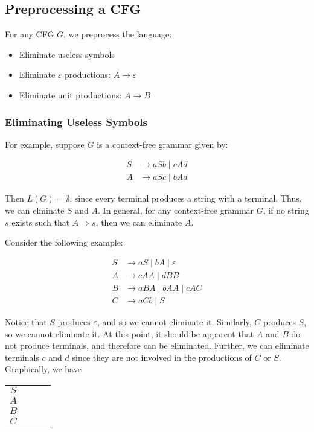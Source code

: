 \subsection{Preprocessing a CFG}\label{subsec:preprocessing-a-cfg}
For any CFG \(G\), we preprocess the language:

\begin{itemize}
    \item Eliminate useless symbols
    \item Eliminate \(\varepsilon \) productions: \(A\to\varepsilon \)
    \item Eliminate unit productions: \(A\to B\)
\end{itemize}

\subsubsection{Eliminating Useless Symbols}\label{subsubsec:eliminating-useless-symbols}
For example, suppose \(G\) is a context-free grammar given by:\@

\begin{align*}
    S &\to aSb\mid cAd\\
    A &\to aSc\mid bAd 
\end{align*}

Then \(L(G)=\emptyset \), since every terminal produces a string with a terminal. Thus, we can elminate \(S\) and \(A\). In general, for any context-free grammar \(G\), if no string \(s\) exists such that \(A\Rightarrow s\), then we can eliminate \(A\). 

Consider the following example:\@

\begin{align*}
    S &\to aS\mid bA\mid \varepsilon \\
    A &\to cAA\mid dBB\\
    B &\to aBA\mid bAA\mid cAC\\
    C &\to aCb\mid S
\end{align*}

Notice that \(S\) produces \(\varepsilon \), and so we cannot eliminate it. Similarly, \(C\) produces \(S\), so we cannot eliminate it. At this point, it should be apparent that \(A\) and \(B\) do not produce terminals, and therefore can be eliminated. Further, we can eliminate terminals \(c\) and \(d\) since they are not involved in the productions of \(C\) or \(S\). Graphically, we have

\begin{tabular}{c c c c}
    \(S\) & & & \\
    \(A\) & & & \\
    \(B\) & & & \\
    \(C\) & & &
\end{tabular}

